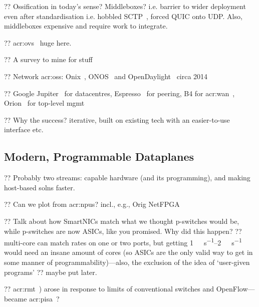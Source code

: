 ?? Ossification in today's sense? Middleboxes? i.e. barrier to wider deployment even after standardisation i.e. hobbled SCTP~\parencite{rfc4960}, forced QUIC onto UDP. Also, middleboxes expensive and require work to integrate.

?? \gls{acr:ovs}~\parencite{DBLP:conf/nsdi/PfaffPKJZRGWSSA15,DBLP:conf/sigcomm/TuWAP21} huge here.

?? A survey to mine for stuff~\parencite{DBLP:journals/comsur/NunesMNOT14}

?? Network \glspl{acr:os}: Onix~\parencite{DBLP:conf/osdi/KoponenCGSPZRIIHS10}, ONOS~\parencite{onos} and OpenDaylight~\parencite{opendaylight} circa 2014

?? Google Jupiter~\parencite{DBLP:conf/sigcomm/SinghOAAABBDFGK15} for datacentres, Espresso~\parencite{DBLP:conf/sigcomm/YapMRPHBHKNJLRR17} for peering, B4 for \gls{acr:wan}~\parencite{DBLP:conf/sigcomm/JainKMOPSVWZZZHSV13,DBLP:conf/sigcomm/HongMAZABBJKLMP18}, Orion~\parencite{DBLP:conf/nsdi/FergusonGHKMMOP21} for top-level mgmt

?? Why the success? iterative, built on existing tech with an easier-to-use interface etc.

\subsection{Modern, Programmable Dataplanes}\label{sec:modern-pdps}
?? Probably two streams: capable hardware (and its programming), and making host-based solns faster.

?? Can we plot from \glspl{acr:npu}? incl., e.g., Orig NetFPGA~\parencite{DBLP:conf/mse/LockwoodMWGHNRL07}

?? Talk about how SmartNICs match what we thought p-switches would be, while p-switches are now ASICs, like you promised. Why did this happen? ?? multi-core can match rates on one or two ports, but getting \qtyrange{1}{2}{\tera\bit\per\second} would need an insane amount of cores (so ASICs are the only valid way to get in some manner of programmability)---also, the exclusion of the idea of `user-given programs' ?? maybe put later.

?? \gls{acr:rmt}~\parencite{DBLP:conf/sigcomm/BosshartGKVMIMH13}) arose in response to limits of conventional switches and OpenFlow---became \gls{acr:pisa}~\parencite{barefoot-pisa}?

